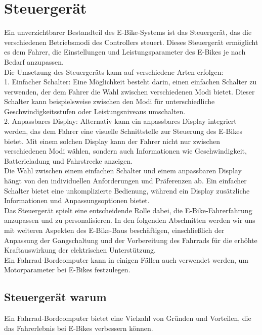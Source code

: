 
\chapter{Steuergerät}
Ein unverzichtbarer Bestandteil des E-Bike-Systems ist das Steuergerät, das die verschiedenen Betriebsmodi des Controllers steuert. Dieses Steuergerät ermöglicht es dem Fahrer, die Einstellungen und Leistungsparameter des E-Bikes je nach Bedarf anzupassen.\\

Die Umsetzung des Steuergeräts kann auf verschiedene Arten erfolgen:\\

    1. Einfacher Schalter: Eine Möglichkeit besteht darin, einen einfachen Schalter zu verwenden, der dem Fahrer die Wahl zwischen verschiedenen Modi bietet. Dieser Schalter kann beispielsweise zwischen den Modi für unterschiedliche Geschwindigkeitsstufen oder Leistungsniveaus umschalten.\\

    2. Anpassbares Display: Alternativ kann ein anpassbares Display integriert werden, das dem Fahrer eine visuelle Schnittstelle zur Steuerung des E-Bikes bietet. Mit einem solchen Display kann der Fahrer nicht nur zwischen verschiedenen Modi wählen, sondern auch Informationen wie Geschwindigkeit, Batterieladung und Fahrstrecke anzeigen.\\

Die Wahl zwischen einem einfachen Schalter und einem anpassbaren Display hängt von den individuellen Anforderungen und Präferenzen ab. Ein einfacher Schalter bietet eine unkomplizierte Bedienung, während ein Display zusätzliche Informationen und Anpassungsoptionen bietet.\\

Das Steuergerät spielt eine entscheidende Rolle dabei, die E-Bike-Fahrerfahrung anzupassen und zu personalisieren. In den folgenden Abschnitten werden wir uns mit weiteren Aspekten des E-Bike-Baus beschäftigen, einschließlich der Anpassung der Gangschaltung und der Vorbereitung des Fahrrads für die erhöhte Kraftauswirkung der elektrischen Unterstützung.\\

Ein Fahrrad-Bordcomputer kann in einigen Fällen auch verwendet werden, um Motorparameter bei E-Bikes festzulegen.
\section{Steuergerät warum}
Ein Fahrrad-Bordcomputer bietet eine Vielzahl von Gründen und Vorteilen, die das Fahrerlebnis bei E-Bikes verbessern können.

